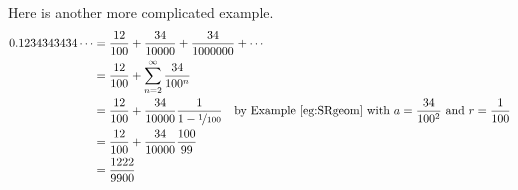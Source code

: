 \begin{eg}
Here is another more complicated example.
\begin{align*}
0.1234343434\cdots
&=\frac{12}{100}+\frac{34}{10000}+\frac{34}{1000000}+\cdots \\
&=\frac{12}{100}+\sum_{n=2}^\infty\frac{34}{100^n} \\
&=\frac{12}{100}+\frac{34}{10000}\frac{1}{1-\nicefrac{1}{100}}
     \quad\text{by Example \ref{eg:SRgeom} with $a=\frac{34}{100^2}$
and $r=\frac{1}{100}$} \\
&=\frac{12}{100}+\frac{34}{10000}\frac{100}{99} \\
&=\frac{1222}{9900}
\end{align*}

\end{eg}

